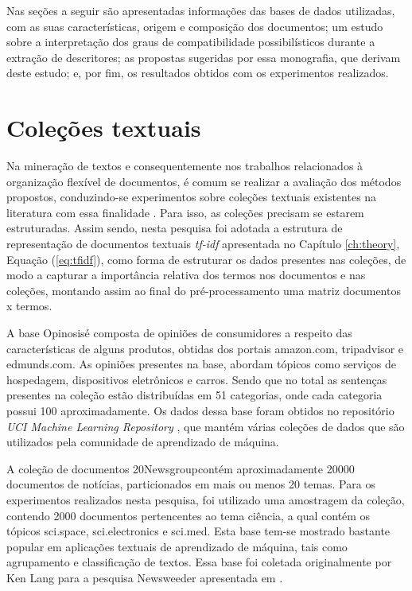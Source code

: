 Nas seções a seguir são apresentadas informações das bases de dados utilizadas, com as
suas características, origem e composição dos documentos; um
estudo sobre a interpretação dos graus de compatibilidade possibilísticos durante a extração de
descritores; as propostas sugeridas por essa monografia, que derivam deste
estudo; e, por fim, os resultados obtidos com os experimentos realizados.

\section{Coleções textuais}
\label{section:datasets}

Na mineração de textos e consequentemente nos trabalhos relacionados à organização flexível de
documentos, é comum se realizar a avaliação dos métodos propostos, conduzindo-se experimentos sobre
coleções textuais existentes na literatura com essa finalidade \cite{Rossi2013}. Para isso, as
coleções precisam se estarem estruturadas. Assim sendo, nesta pesquisa foi adotada a estrutura de
representação de documentos textuais {\it tf-idf\/} apresentada no Capítulo \ref{ch:theory}, Equação
(\ref{eq:tfidf}), como forma de estruturar os dados presentes nas coleções, de modo a capturar a
importância relativa dos termos nos documentos e nas coleções, montando assim ao final do
pré-processamento uma matriz documentos x termos.

A base Opinosis\footnotemark é composta de opiniões de consumidores a respeito das características
de alguns produtos, obtidas dos portais amazon.com, tripadvisor e edmunds.com. As opiniões presentes
na base, abordam tópicos como serviços de hospedagem, dispositivos eletrônicos e carros. Sendo que
no total as sentenças presentes na coleção estão distribuídas em 51 categorias, onde cada categoria
possui 100 aproximadamente. Os dados dessa base foram obtidos no repositório {\it UCI Machine
Learning Repository\/} \cite{Frank2010}, que mantém várias coleções de dados que são utilizados pela
comunidade de aprendizado de máquina.

A coleção de documentos 20Newsgroup\footnotemark contém aproximadamente 20000 documentos de
notícias, particionados em mais ou menos 20 temas. Para os experimentos realizados nesta pesquisa,
foi utilizado uma amostragem da coleção, contendo 2000 documentos pertencentes ao tema ciência, a
qual contém os tópicos sci.space, sci.electronics e sci.med. Esta base tem-se mostrado bastante
popular em aplicações textuais de aprendizado de máquina, tais como agrupamento e classificação de
textos.  Essa base foi coletada originalmente por Ken Lang para a pesquisa Newsweeder apresentada em
\cite{Lang1995}.  

